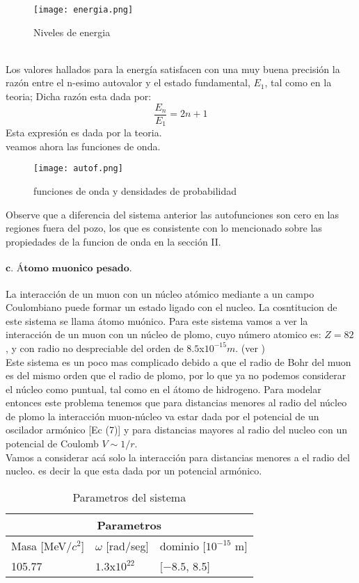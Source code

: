 \documentclass[9pt,twocolumn,twoside]{osajnl}
\begin{document}
\begin{figure}[H]
    \centering
    \texttt{[image: energia.png]}
    \caption{Niveles de energia}
    \label{fig:my_label}
\end{figure}
\\
Los valores hallados para la energía satisfacen con una muy buena precisión la razón entre el n-esimo autovalor y el estado fundamental, $E_1$, tal como en la teoria; Dicha razón esta dada por:
$$\frac{E_n}{E_1}=2n+1$$
Esta expresión es dada por la teoria. \\
veamos ahora las funciones de onda.
\begin{figure}[H]
    \centering
    \texttt{[image: autof.png]}
    \caption{funciones de onda y densidades de probabilidad}
    \label{fig:my_label}
\end{figure}
Observe que a diferencia del sistema anterior las autofunciones son cero en las regiones fuera del pozo, los que es consistente con lo mencionado sobre las propiedades de la funcion de onda en la sección II. \\ \\
$\textbf{c. Átomo muonico pesado.}$ \\ \\
La interacción de un muon con un núcleo atómico mediante a un campo Coulombiano puede formar un estado ligado con el nucleo. La cosntitucion de este sistema se llama átomo muónico.
Para este sistema vamos a ver la interacción de un muon con un núcleo de plomo, cuyo número atomico es: $Z=82$, y con radio no despreciable del orden de $8.5$x$10^{-15}m$. (ver \cite{Tannoudji}) \\
Este sistema es un poco mas complicado debido a que el radio de Bohr del muon es del mismo orden que el radio de plomo, por lo que ya no podemos considerar el núcleo como puntual, tal como en el átomo de hidrogeno.
Para modelar entonces este problema tenemos que para distancias menores al radio del núcleo de plomo la interacción muon-núcleo va estar dada  por el potencial de un oscilador armónico [Ec (7)] y para distancias mayores al radio del nucleo con un potencial de Coulomb $V \sim 1/r$.\\
Vamos a considerar acá solo la interacción para distancias menores a el radio del nucleo. es decir la que esta dada por un potencial armónico.
\begin{table}[h!]
\Centering
\begin{tabular}{ |p{2.8cm}|p{2.8cm}|p{2.4cm}|  }
 \hline
 \multicolumn{3}{|c|}{Parametros } \\
 \hline
 Masa [MeV/$c^2$] & $\omega$ [rad/seg] &   dominio [$10^{-15}$ m]\\[0.1ex] 
 \hline
 105.77   &   $1.3$x$10^{22}$  &  $[-8.5$, 8.5$]$ \\[0.1ex]
\hline
\end{tabular}
\caption{Parametros del sistema}
\end{table}
\end{document}
